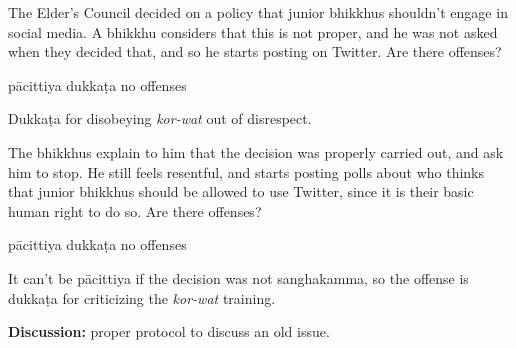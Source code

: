 \begin{exam}{\autoExamName}
  \problemDivide

  \begin{problem*}

    \begin{parts}

    \item The Elder's Council decided on a policy that junior bhikkhus shouldn't
      engage in social media. A bhikkhu considers that this is not proper, and
      he was not asked when they decided that, and so he starts posting on
      Twitter.
      Are there offenses?

    \bigskip

      \begin{answers}{3}
        \bChoices
         pācittiya\eAns
         dukkaṭa\eAns
         no offenses\eAns
        \eChoices
      \end{answers}

      \begin{solution}
        Dukkaṭa for disobeying \emph{kor-wat} out of disrespect.
      \end{solution}

    \item The bhikkhus explain to him that the decision was properly carried
      out, and ask him to stop. He still feels resentful, and starts posting
      polls about who thinks that junior bhikkhus should be allowed to use
      Twitter, since it is their basic human right to do so. Are there offenses?

    \bigskip

      \begin{answers}{3}
        \bChoices
         pācittiya\eAns
         dukkaṭa\eAns
         no offenses\eAns
        \eChoices
      \end{answers}

      \begin{solution}
        It can't be pācittiya if the decision was not sanghakamma, so the
        offense is dukkaṭa for criticizing the \emph{kor-wat} training.
      \end{solution}

      \bigskip
      
      \textbf{Discussion:} proper protocol to discuss an old issue.

    \end{parts}

  \end{problem*}

  \problemDivide


\end{exam}
